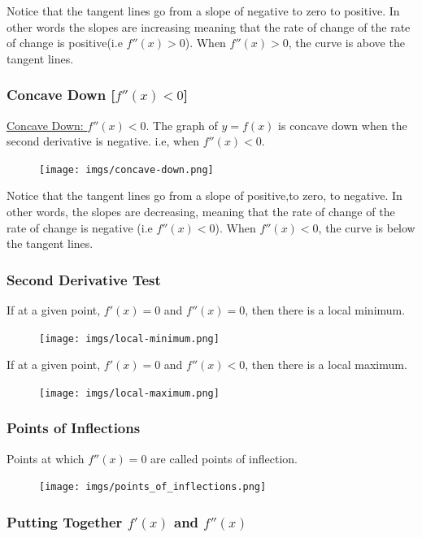 \documentclass{article}
\begin{document}
Notice that the tangent lines go from a slope of negative to zero to positive. In other words the slopes are increasing meaning that the rate of change of the rate of change is positive(i.e $f''(x)>0$). When $f''(x)>0$, the curve is above the tangent lines. 

\subsubsection{Concave Down [$f''(x)<0$]}
\underline{Concave Down: } $f''(x)<0$. The graph of $y=f(x)$ is concave down when the second derivative is negative. i.e, when $f''(x)<0$.
\begin{figure}[ht]
    \centering
    \texttt{[image: imgs/concave-down.png]}
\end{figure}

Notice that the tangent lines go from a slope of positive,to zero, to negative. In other words, the slopes are decreasing, meaning that the rate of change of the rate of change is negative (i.e  $f''(x)<0$). When $f''(x)<0$, the curve is below the tangent lines.

\subsubsection{Second Derivative Test}
If at a given point, $f'(x)=0$ and $f''(x)=0$, then there is a local minimum.
\begin{figure}[ht]
    \centering
    \texttt{[image: imgs/local-minimum.png]}
\end{figure}

If at a given point, $f'(x)=0$ and $f''(x)<0$, then there is a local maximum.
\begin{figure}[ht]
    \centering
    \texttt{[image: imgs/local-maximum.png]}
\end{figure}

\subsubsection{Points of Inflections}
Points at which $f''(x)=0$ are called points of inflection.
\begin{figure}[ht]
    \centering
    \texttt{[image: imgs/points\_of\_inflections.png]}
\end{figure}
\newpage 
\subsubsection{Putting Together $f'(x)$ and $f''(x)$}
\end{document}
